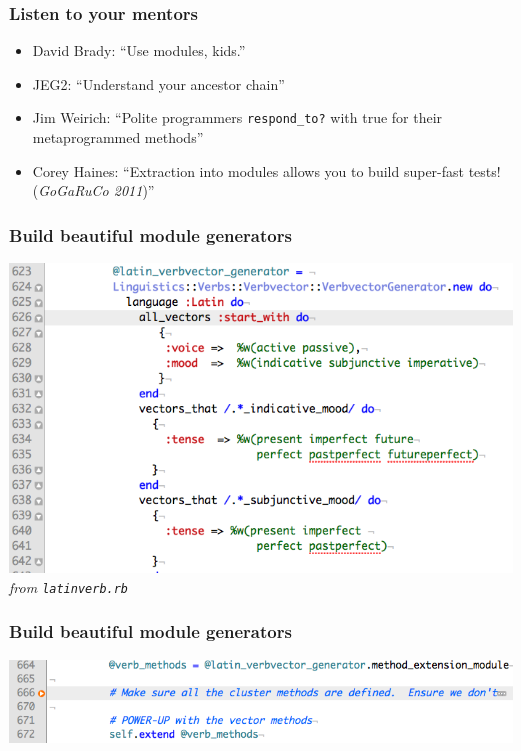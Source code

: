 \documentclass[slidestop,compress,mathserif]{beamer}
\begin{document}
\begin{frame}
	\frametitle{Listen to your mentors}
	\begin{itemize}
		\item David Brady:  ``Use modules, kids.''
		\item JEG2:  ``Understand your ancestor chain''
		\item Jim Weirich:  ``Polite programmers \texttt{respond\_to?} with true for their metaprogrammed methods''
		\item Corey Haines:  ``Extraction into modules allows you to build super-fast tests! (\emph{GoGaRuCo 2011})''
	\end{itemize}
\end{frame}

\begin{frame}
	\frametitle{Build beautiful module generators}
	\begin{center}
		\includegraphics[scale=0.35]{img/ll_dsl.png} \\
		\emph{from \texttt{latinverb.rb}}
	\end{center}	
\end{frame}

\begin{frame}
	\frametitle{Build beautiful module generators}
	\begin{center}
		\includegraphics[scale=0.35]{img/ll_mod_inc.png}
	\end{center}	
\end{frame}
\end{document}
